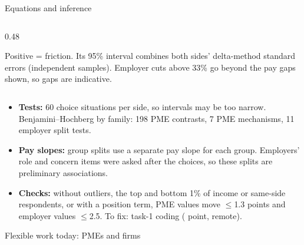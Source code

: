 \begin{frame}[t,label=B-methods]{Equations and inference}
\begin{columns}[T,onlytextwidth]
\begin{column}{0.48\textwidth}
      {\fontsize{9}{11}\selectfont\RaggedRight Positive = friction. Its 95\% interval combines both sides' delta-method standard errors (independent samples). Employer cuts above 33\% go beyond the pay gaps shown, so gaps are indicative.\par}
    \end{column}
  \end{columns}
  \vspace{0.06cm}
  \begin{itemize}\setlength{\itemsep}{0.03cm}
    \item \textbf{Tests:} 60 choice situations per side, so intervals may be too narrow. Benjamini--Hochberg by family: 198 PME contrasts, 7 PME mechanisms, 11 employer split tests.
    \item \textbf{Pay slopes:} group splits use a separate pay slope for each group. Employers' role and concern items were asked after the choices, so these splits are preliminary associations.
    \item \textbf{Checks:} without outliers, the top and bottom 1\% of income or same-side respondents, or with a position term, PME values move $\le$1.3 points and employer values $\le$2.5. To fix: task-1 coding ( point, remote).
  \end{itemize}
\end{frame}

\begin{frame}[t,label=B-landscape]{Flexible work today: PMEs and firms}
  \FrameTop
\end{frame}

